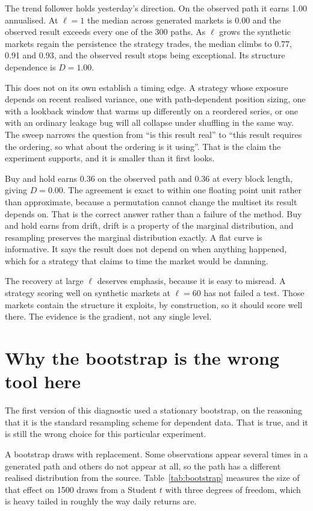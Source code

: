 \documentclass[11pt]{article}
\begin{document}
The trend follower holds yesterday's direction. On the observed path it earns 1.00 annualised. At $\ell = 1$ the median across generated markets is 0.00 and the observed result exceeds every one of the 300 paths. As $\ell$ grows the synthetic markets regain the persistence the strategy trades, the median climbs to 0.77, 0.91 and 0.93, and the observed result stops being exceptional. Its structure dependence is $D = 1.00$.

This does not on its own establish a timing edge. A strategy whose exposure depends on recent realised variance, one with path-dependent position sizing, one with a lookback window that warms up differently on a reordered series, or one with an ordinary leakage bug will all collapse under shuffling in the same way. The sweep narrows the question from ``is this result real'' to ``this result requires the ordering, so what about the ordering is it using''. That is the claim the experiment supports, and it is smaller than it first looks.

Buy and hold earns 0.36 on the observed path and 0.36 at every block length, giving $D = 0.00$. The agreement is exact to within one floating point unit rather than approximate, because a permutation cannot change the multiset its result depends on. That is the correct answer rather than a failure of the method. Buy and hold earns from drift, drift is a property of the marginal distribution, and resampling preserves the marginal distribution exactly. A flat curve is informative. It says the result does not depend on when anything happened, which for a strategy that claims to time the market would be damning.

The recovery at large $\ell$ deserves emphasis, because it is easy to misread. A strategy scoring well on synthetic markets at $\ell = 60$ has not failed a test. Those markets contain the structure it exploits, by construction, so it should score well there. The evidence is the gradient, not any single level.

\section{Why the bootstrap is the wrong tool here}\label{sec:bootstrap}

The first version of this diagnostic used a stationary bootstrap, on the
reasoning that it is the standard resampling scheme for dependent data. That is
true, and it is still the wrong choice for this particular experiment.

A bootstrap draws with replacement. Some observations appear several times in a
generated path and others do not appear at all, so the path has a different
realised distribution from the source. Table~\ref{tab:bootstrap} measures the
size of that effect on 1500 draws from a Student $t$ with three degrees of
freedom, which is heavy tailed in roughly the way daily returns are.
\end{document}
